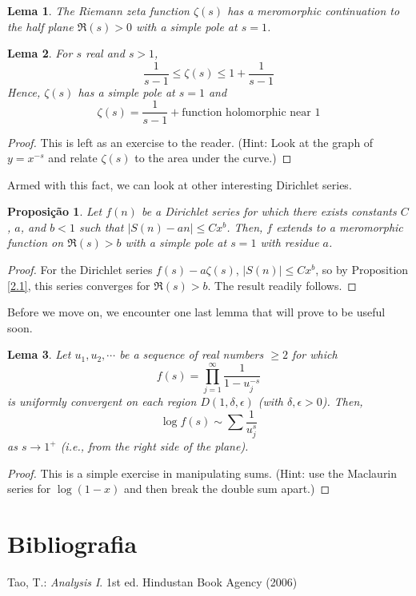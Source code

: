 \documentclass{article}
\theoremstyle{plain}
\newtheorem{prop}{Proposição}
\newtheorem{lemma}{Lema}
\theoremstyle{remark}
\numberwithin{equation}{section}
\numberwithin{thm}{section}
\numberwithin{defn}{section}
\numberwithin{lemma}{section}
\numberwithin{axm}{section}
\begin{document}
\begin{lemma}
The Riemann zeta function $\zeta(s)$ has a meromorphic continuation to the half plane $\Re(s) > 0$ with a simple pole at $s = 1$.
\end{lemma}

\begin{lemma}
For $s$ real and $s > 1$, $$\frac{1}{s-1} \le \zeta(s) \le 1 + \frac{1}{s-1}$$ Hence, $\zeta(s)$ has a simple pole at $s = 1$ and $$\zeta(s) = \frac{1}{s-1} + \text{function holomorphic near } 1$$
\end{lemma}

\begin{proof}
This is left as an exercise to the reader. (Hint: Look at the graph of $y = x^{-s}$ and relate $\zeta(s)$ to the area under the curve.)
\end{proof}

Armed with this fact, we can look at other interesting Dirichlet series. 

\begin{prop}
Let $f(n)$ be a Dirichlet series for which there exists constants $C$, $a$, and $b < 1$ such that $|S(n) - an| \le Cx^b$. Then, $f$ extends to a meromorphic function on $\Re(s) > b$ with a simple pole at $s = 1$ with residue $a$. 
\end{prop}

\begin{proof}
For the Dirichlet series $f(s) - a\zeta(s)$, $|S(n)| \le Cx^b$, so by Proposition \ref{2.1}, this series converges for $\Re(s) > b$. The result readily follows.  
\end{proof}

Before we move on, we encounter one last lemma that will prove to be useful soon.

\begin{lemma} \label{2.5}
Let $u_1, u_2, \cdots$ be a sequence of real numbers $\ge 2$ for which $$f(s) = \prod_{j = 1}^{\infty} \frac{1}{1 - u_{j}^{-s}}$$ is uniformly convergent on each region $D(1, \delta, \epsilon)$ (with $\delta, \epsilon > 0$). Then, $$\log f(s) \sim \sum \frac{1}{u_{j}^{s}}$$ as $s \to 1^{+}$ (i.e., from the right side of the plane). 
\end{lemma}

\begin{proof}
This is a simple exercise in manipulating sums. (Hint: use the Maclaurin series for $\log(1-x)$ and then break the double sum apart.)
\end{proof}

\section*{Bibliografia}
\begin{thebibliography}{1}

Tao, T.: \textit{Analysis I}. 1st ed. Hindustan Book Agency (2006)
\end{thebibliography}
\end{document}
